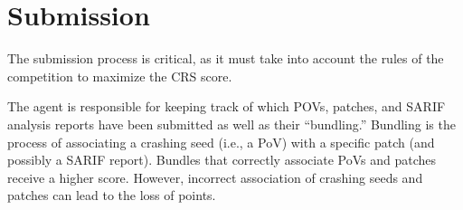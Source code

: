 \section{Submission}

The submission process is critical, as it must take into account the rules of the competition to maximize the CRS score.

The \patcherg agent is responsible for keeping track of which POVs, patches, and SARIF analysis reports have been submitted as well as their ``bundling.''
Bundling is the process of associating a crashing seed (i.e., a PoV) with a specific patch (and possibly a SARIF report).
Bundles that correctly associate PoVs and patches receive a higher score.
However, incorrect association of crashing seeds and patches can lead to the loss of points.


